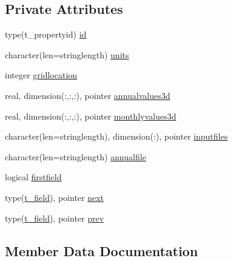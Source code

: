 \subsection*{Private Attributes}
\begin{DoxyCompactItemize}
\item 
type(t\+\_\+propertyid) \mbox{\hyperlink{structmodulelevitusformat_1_1t__field_ac7340534834b0c8e02c6bd5e73a0aca8}{id}}
\item 
character(len=stringlength) \mbox{\hyperlink{structmodulelevitusformat_1_1t__field_a910648a1022392862cfe0252e0cf5c25}{units}}
\item 
integer \mbox{\hyperlink{structmodulelevitusformat_1_1t__field_a7f874b8b1d953e4756df0a586da6ebd0}{gridlocation}}
\item 
real, dimension(\+:,\+:,\+:), pointer \mbox{\hyperlink{structmodulelevitusformat_1_1t__field_a97f1d980e14833858a079a7c107d1a97}{annualvalues3d}}
\item 
real, dimension(\+:,\+:,\+:), pointer \mbox{\hyperlink{structmodulelevitusformat_1_1t__field_a351370764ff3ff151aaf481a8c80f54c}{monthlyvalues3d}}
\item 
character(len=stringlength), dimension(\+:), pointer \mbox{\hyperlink{structmodulelevitusformat_1_1t__field_adf161eb957fd1863baa6c2e5e29d4e95}{inputfiles}}
\item 
character(len=stringlength) \mbox{\hyperlink{structmodulelevitusformat_1_1t__field_a1bbf6a151f8b82595d22516e483c5319}{annualfile}}
\item 
logical \mbox{\hyperlink{structmodulelevitusformat_1_1t__field_ae815955c4ff7e3f2a5c45998f553ed46}{firstfield}}
\item 
type(\mbox{\hyperlink{structmodulelevitusformat_1_1t__field}{t\+\_\+field}}), pointer \mbox{\hyperlink{structmodulelevitusformat_1_1t__field_a4ec9b79c7a47e2333566c555c1c186d0}{next}}
\item 
type(\mbox{\hyperlink{structmodulelevitusformat_1_1t__field}{t\+\_\+field}}), pointer \mbox{\hyperlink{structmodulelevitusformat_1_1t__field_a0da8b4d12af7831a21660cbcfc75a7e4}{prev}}
\end{DoxyCompactItemize}


\subsection{Member Data Documentation}
\mbox{\label{structmodulelevitusformat_1_1t__field_a1bbf6a151f8b82595d22516e483c5319}} 
